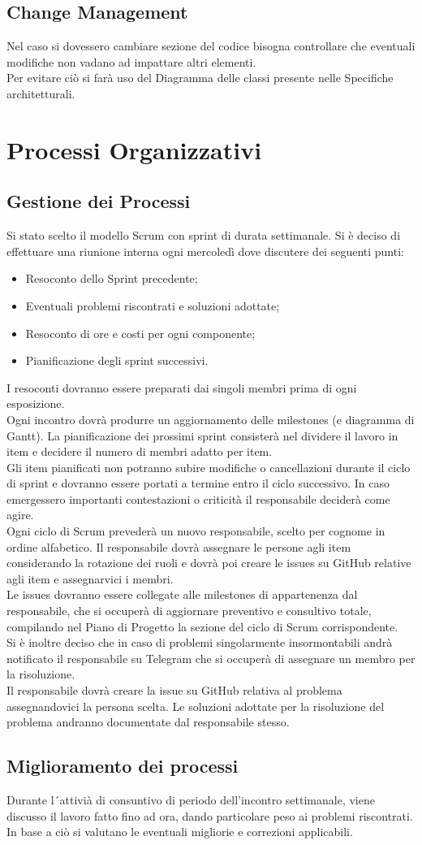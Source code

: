 \documentclass[a4paper, 12pt]{article}
\begin{document}
\subsection{Change Management}
Nel caso si dovessero cambiare sezione del codice bisogna controllare che eventuali modifiche
non vadano ad impattare altri elementi.\\
Per evitare ciò si farà uso del Diagramma delle classi presente nelle Specifiche architetturali.
\section{Processi Organizzativi}
\subsection{Gestione dei Processi}
Si stato scelto il modello Scrum con sprint di durata settimanale. Si è deciso di effettuare una riunione interna ogni mercoledì dove discutere dei seguenti punti:
\begin{itemize}
    \item Resoconto dello Sprint precedente;
    \item Eventuali problemi riscontrati e soluzioni adottate;
    \item Resoconto di ore e costi per ogni componente;
    \item Pianificazione degli sprint successivi.
\end{itemize}
I resoconti dovranno essere preparati dai singoli membri prima di ogni esposizione.\\ Ogni incontro dovrà produrre un aggiornamento delle milestones (e diagramma di Gantt). La pianificazione dei prossimi sprint consisterà nel dividere il lavoro in item e decidere il
numero di membri adatto per item. \\
Gli item pianificati non potranno subire modifiche o cancellazioni durante il ciclo di sprint e dovranno essere portati a termine entro il ciclo successivo.
In caso emergessero importanti contestazioni o criticità il responsabile deciderà
come agire.\\
Ogni ciclo di Scrum prevederà un nuovo responsabile, scelto per cognome in ordine alfabetico. Il responsabile dovrà assegnare le persone agli item considerando la
rotazione dei ruoli e dovrà poi creare le issues su GitHub relative agli item
e assegnarvici i membri. \\
Le issues dovranno essere collegate alle milestones di appartenenza
dal responsabile, che si occuperà di aggiornare preventivo e consultivo
totale, compilando nel Piano di Progetto la sezione del ciclo di Scrum corrispondente. \\
Si è inoltre deciso che in caso di problemi singolarmente insormontabili andrà notificato
il responsabile su Telegram che si occuperà di assegnare un membro per la risoluzione. \\
Il responsabile dovrà creare la issue su GitHub relativa al problema assegnandovici la persona
scelta. Le soluzioni adottate per la risoluzione del problema andranno documentate
dal responsabile stesso.
\subsection{Miglioramento dei processi}
Durante l´attivià di consuntivo di periodo dell’incontro settimanale, viene discusso il lavoro
fatto fino ad ora, dando particolare peso ai problemi riscontrati. \\In base a ciò si valutano
le eventuali migliorie e correzioni applicabili.
\end{document}
